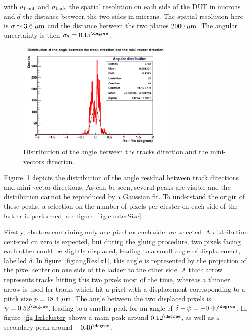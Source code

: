    with $\sigma_{\rm{front}}$ and $\sigma_{\rm{back}}$ the spatial resolution on each side of the \gls{DUT} in microns and $d$ the distance between the two sides in microns.
   The spatial resolution here is $\sigma \simeq 3.6~\rm{\mu m}$ and the distance between the two planes $2000~\rm{\mu m}$.
   The angular uncertainty is then $\sigma_{\theta} = 0.15^{\degree}$.  
   
   \begin{figure}[!tbh]
     \centering
     \includegraphics[width = 0.7\textwidth]{Pictures/deformation/hDiffAngleX_226056.png}
     \caption{Distribution of the angle between the tracks direction and the mini-vectors direction.}
     \label{fig:angRes}
   \end{figure}

   Figure~\ref{fig:angRes} depicts the distribution of the angle residual between track directions and mini-vector directions.
   As can be seen, several peaks are visible and the distribution cannot be reproduced by a Gaussian fit.
   To understand the origin of these peaks, a selection on the number of pixels per cluster on each side of the ladder is performed, see figure~\ref{fig:clusterSize}.
   
   Firstly, clusters containing only one pixel on each side are selected.
   A distribution centered on zero is expected, but during the gluing procedure, two pixels facing each other could be slightly displaced, leading to a small angle of displacement, labelled $\delta$.
   In figure~\ref{fig:angRes1x1}, this angle is represented by the projection of the pixel center on one side of the ladder to the other side.
   A thick arrow represents tracks hitting this two pixels most of the time, whereas a thinner arrow is used for tracks which hit a pixel with a displacement corresponding to a pitch size $p = 18.4~\rm{\mu m}$.
   The angle between the two displaced pixels is $\psi = 0.52^{\degree}$, leading to a smaller peak for an angle of $\delta - \psi = -0.40^{\degree}$.
   In figure~\ref{fig:1x1cluster} shows a main peak around $0.12^{\degree}$, as well as a secondary peak around $-0.40^{\degree}$.

